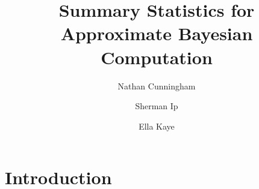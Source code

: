 \documentclass[a4paper,10pt]{article}
\title{Summary Statistics for Approximate Bayesian Computation}
\author{Nathan Cunningham \and Sherman Ip \and Ella Kaye}
\begin{document}
\maketitle

\section{Introduction}




% 
\end{document}
